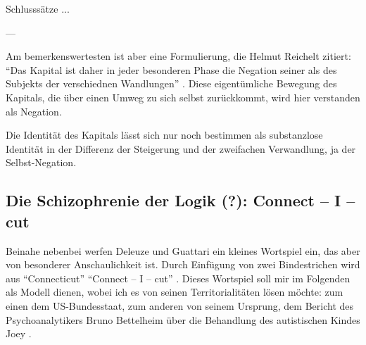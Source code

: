 \documentclass[12pt,
               DIV13,
               paper=a4,
               twoside=false,
               onehalfspacing,
               bibliography=totoc,
               toc=graduated,
               draft,
               ]{scrartcl}
\newcommand{\pc}[2]{\parencite[#1]{#2}}
\newcommand{\zn}[3]{\parencite[#1, zit. nach][#2]{#3}}
\newcommand{\worries}[1]{\ifdraft{\textcolor{blue}{\texttt{(#1)}}}{}}
\newcommand{\gwg}{G--W--G'\xspace}
\newcommand{\cic}{Connect -- I -- cut\xspace}
\newcommand{\dg}{Deleuze und Guattari\xspace}
\begin{document}
Schlusssätze ...

---






Am bemerkenswertesten ist aber eine Formulierung, die Helmut Reichelt
zitiert: "`Das Kapital ist daher in jeder besonderen Phase die
Negation seiner als des Subjekts der verschiednen Wandlungen"'
\zn{Marx}{181}{reichelt}. Diese eigentümliche Bewegung des Kapitals,
die über einen Umweg zu sich selbst zurückkommt, wird hier verstanden
als Negation.

Die Identität des Kapitals lässt sich nur noch bestimmen als
substanzlose Identität in der Differenz der Steigerung und der
zweifachen Verwandlung, ja der Selbst-Negation. \worries{?}




\subsection{Die Schizophrenie der Logik (?): \cic}

%

Beinahe nebenbei werfen \dg ein kleines Wortspiel ein, das aber von
besonderer Anschaulichkeit ist. Durch Einfügung von zwei Bindestrichen
wird aus "`Connecticut"' "`\cic"' \pc{48}{ao}. Dieses Wortspiel soll
mir im Folgenden als Modell dienen, wobei ich es von seinen
Territorialitäten lösen möchte: zum einen dem US-Bundesstaat, zum
anderen von seinem Ursprung, dem Bericht des Psychoanalytikers Bruno
Bettelheim über die Behandlung des autistischen Kindes Joey
\parencites[vgl.][]{joey}[306-446]{emptyf}.
\end{document}
